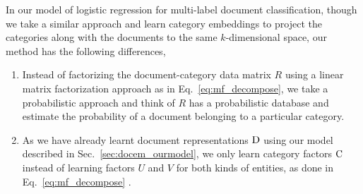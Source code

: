 In our model of logistic regression for multi-label document classification, though we take a similar approach and learn category embeddings to project the categories along with the documents to the same $k$-dimensional space, our method has the following differences,
\begin{enumerate}
\item Instead of factorizing the document-category data matrix $R$ using a linear matrix factorization approach as in Eq.~\ref{eq:mf_decompose}, we take a probabilistic approach and think of $R$ has a probabilistic database and estimate the probability of a document belonging to a particular category.

\item As we have already learnt document representations $\mathrm{D}$ using our model described in Sec.~\ref{sec:docem_ourmodel}, we only learn category factors $\mathrm{C}$ instead of learning factors $U$ and $V$ for both kinds of entities, as done in Eq.~\ref{eq:mf_decompose} .
\end{enumerate}

